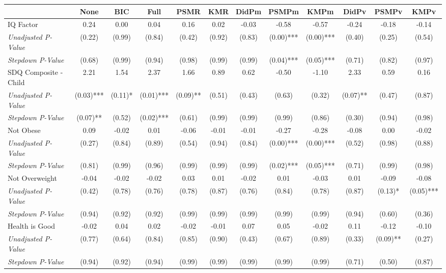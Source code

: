 \begin{tabular}{l c c c c c c c c c c c}
\toprule
 & None & BIC & Full & PSMR & KMR & DidPm & PSMPm & KMPm & DidPv & PSMPv & KMPv \\
\midrule
IQ Factor & 0.24 & 0.00 & 0.04 & 0.16 & 0.02 & -0.03 & -0.58 & -0.57 & -0.24 & -0.18 & -0.14 \\
\quad \textit{Unadjusted P-Value} & (0.22) & (0.99) & (0.84) & (0.42) & (0.92) & (0.83) & (0.00)*** & (0.00)*** & (0.40) & (0.25) & (0.54) \\
\quad \textit{Stepdown P-Value} & (0.68) & (0.99) & (0.94) & (0.98) & (0.99) & (0.99) & (0.04)*** & (0.05)*** & (0.71) & (0.82) & (0.97) \\
SDQ Composite - Child & 2.21 & 1.54 & 2.37 & 1.66 & 0.89 & 0.62 & -0.50 & -1.10 & 2.33 & 0.59 & 0.16 \\
\quad \textit{Unadjusted P-Value} & (0.03)*** & (0.11)* & (0.01)*** & (0.09)** & (0.51) & (0.43) & (0.63) & (0.32) & (0.07)** & (0.47) & (0.87) \\
\quad \textit{Stepdown P-Value} & (0.07)** & (0.52) & (0.02)*** & (0.61) & (0.99) & (0.99) & (0.99) & (0.86) & (0.30) & (0.94) & (0.98) \\
Not Obese & 0.09 & -0.02 & 0.01 & -0.06 & -0.01 & -0.01 & -0.27 & -0.28 & -0.08 & 0.00 & -0.02 \\
\quad \textit{Unadjusted P-Value} & (0.27) & (0.84) & (0.89) & (0.54) & (0.94) & (0.84) & (0.00)*** & (0.00)*** & (0.52) & (0.98) & (0.88) \\
\quad \textit{Stepdown P-Value} & (0.81) & (0.99) & (0.96) & (0.99) & (0.99) & (0.99) & (0.02)*** & (0.05)*** & (0.71) & (0.99) & (0.98) \\
Not Overweight & -0.04 & -0.02 & -0.02 & 0.03 & 0.01 & -0.02 & 0.01 & -0.03 & 0.01 & -0.09 & -0.08 \\
\quad \textit{Unadjusted P-Value} & (0.42) & (0.78) & (0.76) & (0.78) & (0.87) & (0.76) & (0.84) & (0.78) & (0.87) & (0.13)* & (0.05)*** \\
\quad \textit{Stepdown P-Value} & (0.94) & (0.92) & (0.92) & (0.99) & (0.99) & (0.99) & (0.99) & (0.99) & (0.94) & (0.60) & (0.36) \\
Health is Good & -0.02 & 0.04 & 0.02 & -0.02 & -0.01 & 0.07 & 0.05 & -0.02 & 0.11 & -0.12 & -0.10 \\
\quad \textit{Unadjusted P-Value} & (0.77) & (0.64) & (0.84) & (0.85) & (0.90) & (0.43) & (0.67) & (0.89) & (0.33) & (0.09)** & (0.27) \\
\quad \textit{Stepdown P-Value} & (0.94) & (0.92) & (0.94) & (0.99) & (0.99) & (0.99) & (0.99) & (0.99) & (0.71) & (0.50) & (0.87) \\

\end{tabular}
